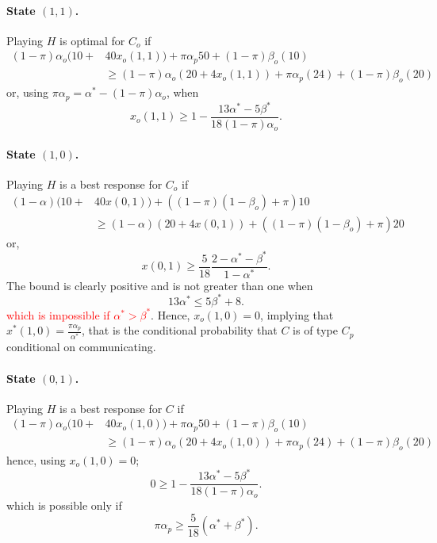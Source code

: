 \documentclass[12pt]{article}
\theoremstyle{break}
\begin{document}
\paragraph{State $(1,1)$.} Playing $H$ is optimal for $C_o$ if
\[\begin{split}
	(1-\pi)\alpha_o (10+&40 x_o(1,1))+\pi \alpha_p 50+(1-\pi)\beta_o (10)\\
		&\geq (1-\pi)\alpha_o (20+4 x_o(1,1))+\pi \alpha_p (24)+(1-\pi)\beta_o (20)
\end{split}
\]
or, using $\pi\alpha_p=\alpha^*-(1-\pi)\alpha_o$, when
\begin{equation}\label{c50-x11}
	x_o(1,1)\geq 1-\frac{13\alpha^*-5\beta^*}{18(1-\pi)\alpha_o}.	
\end{equation}
%
\paragraph{State $(1,0)$.} Playing $H$ is a best response for $C_o$ if
\[\begin{split}
	(1-\alpha) (10+&40 x(0,1))+((1-\pi)(1-\beta_o)+\pi) 10\\
	&\geq (1-\alpha) (20+4 x(0,1))+((1-\pi)(1-\beta_o)+\pi) 20
\end{split}
\]
or,
\[
x(0,1)\geq \frac{5}{18}\frac{2-\alpha^*-\beta^*}{1-\alpha^*}.
\]
The bound is clearly positive and is not greater than one when 
\begin{equation*}
	13\alpha^* \leq  5\beta^*+8.
\end{equation*}
%
\textcolor{red}{which is impossible if $\alpha^*>\beta^*$}. Hence, $x_o(1,0)=0$, implying that $x^*(1,0)=\frac{\pi \alpha_p}{\alpha^*}$, that is the conditional probability that $C$ is of type $C_p$ conditional on communicating.
%							
\paragraph{State $(0,1)$.} Playing $H$ is a best response for $C$ if
\[\begin{split}
	(1-\pi)\alpha_o (10+&40 x_o(1,0))+\pi \alpha_p 50+(1-\pi)\beta_o (10)\\
		&\geq (1-\pi)\alpha_o (20+4 x_o(1,0))+\pi \alpha_p(24)+(1-\pi)\beta_o (20)
\end{split}
\]
hence, using $x_o(1,0)=0$;  
\[
	0\geq 1-\frac{13\alpha^*-5\beta^*}{18(1-\pi)\alpha_o}.
\]
which is possible only if 
\begin{equation}\label{cond-c50-01}
	\pi\alpha_p\geq \frac{5}{18}(\alpha^*+\beta^*).
\end{equation}
\end{document}
